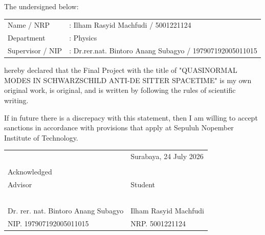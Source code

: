
\vspace{2ex}

\noindent The undersigned below:

\vspace{2ex}

\noindent
\begin{minipage}{\textwidth}
    \begin{tabular}{@{}ll}
        Name / NRP & : Ilham Rasyid Machfudi / 5001221124\\
        Department & : Physics \\
        Supervisor / NIP & : Dr.rer.nat. Bintoro Anang Subagyo / 197907192005011015\\
    \end{tabular}
\end{minipage}

\vspace{2ex}

\noindent hereby declared that the Final Project with the title of "QUASINORMAL MODES IN SCHWARZSCHILD ANTI-DE SITTER SPACETIME" is my own original work, is original, and is written by following the rules of scientific writing.

\vspace{1.5ex}

\noindent If in future there is a discrepacy with this statement, then I am willing to accept sanctions in accordance with provisions that apply at Sepuluh Nopember Institute of Technology.

\vspace{8ex}

\noindent\begin{tabularx}{\textwidth}{X l}
    & Surabaya, 24 July 2026\\
    & \\
    Acknowledged & \\
    Advisor & Student\\
    & \\
    & \\
    & \\
    & \\
    & \\
    Dr. rer. nat. Bintoro Anang Subagyo & Ilham Rasyid Machfudi \\
    NIP. 197907192005011015 & NRP. 5001221124\\
\end{tabularx}

